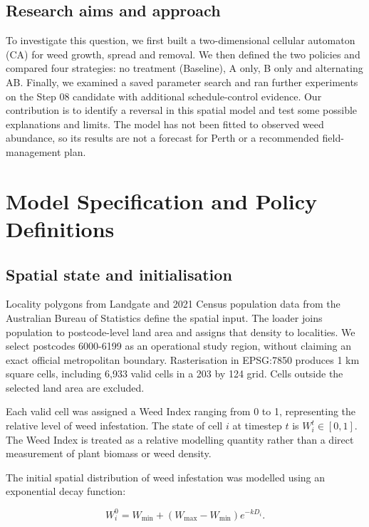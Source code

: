 \documentclass[a4paper,11pt]{article}
\begin{document}
\subsection{Research aims and approach}

To investigate this question, we first built a two-dimensional cellular automaton (CA) for weed growth, spread and removal. We then defined the two policies and compared four strategies: no treatment (Baseline), A only, B only and alternating AB. Finally, we examined a saved parameter search and ran further experiments on the Step 08 candidate with additional schedule-control evidence. Our contribution is to identify a reversal in this spatial model and test some possible explanations and limits. The model has not been fitted to observed weed abundance, so its results are not a forecast for Perth or a recommended field-management plan.

\section{Model Specification and Policy Definitions}

\subsection{Spatial state and initialisation}

Locality polygons from Landgate \cite{landgate} and 2021 Census population data from the Australian Bureau of Statistics \cite{abs} define the spatial input. The loader joins population to postcode-level land area and assigns that density to localities. We select postcodes 6000-6199 as an operational study region, without claiming an exact official metropolitan boundary. Rasterisation in EPSG:7850 produces 1 km square cells, including 6,933 valid cells in a 203 by 124 grid. Cells outside the selected land area are excluded.

Each valid cell was assigned a Weed Index ranging from 0 to 1, representing the relative level of weed infestation. The state of cell $i$ at timestep $t$ is $W_i^t\in[0,1]$. The Weed Index is treated as a relative modelling quantity rather than a direct measurement of plant biomass or weed density.

The initial spatial distribution of weed infestation was modelled using an exponential decay function:

\begin{equation}
W_i^0=W_{\min}+(W_{\max}-W_{\min})e^{-kD_i}.
\label{eq:initial}
\end{equation}
\end{document}
